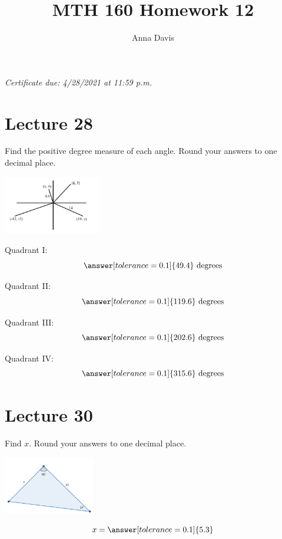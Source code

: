 \documentclass{ximera}
\author{Anna Davis} \title{MTH 160 Homework 12}
\begin{document}
\begin{abstract}

\end{abstract}
\maketitle
 \textit{Certificate due: 4/28/2021 at 11:59 p.m.}
 
  \section{Lecture 28}
\begin{problem}\label{prob:160hom11prob1}
Find the positive degree measure of each angle. Round your answers to one decimal place.
\begin{image}
   
\includegraphics[height=1in]{160H11pic1.jpg}~
 
\end{image}

Quadrant I:
$$\answer[tolerance=0.1]{49.4}\mbox{ degrees}$$

Quadrant II:
$$\answer[tolerance=0.1]{119.6}\mbox{ degrees}$$

Quadrant III:
$$\answer[tolerance=0.1]{202.6}\mbox{ degrees}$$

Quadrant IV:
$$\answer[tolerance=0.1]{315.6}\mbox{ degrees}$$
\end{problem}
 
 
 
 
 
  \section{Lecture 30}
  \begin{problem}\label{prob:160hom12prob1}
  Find $x$.  Round your answers to one decimal place.
\begin{image}
   
\includegraphics[height=1in]{160H12pic1.jpg}~
 
\end{image}
$$x=\answer[tolerance=0.1]{5.3}$$
\end{problem}
\end{document}
